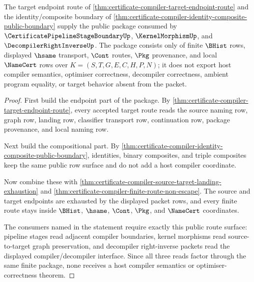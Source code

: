 \begin{theorem}
\label{thm:certificate-compiler-downstream-stage-unblock-package}
The target endpoint route of
\autoref{thm:certificate-compiler-target-endpoint-route} and the
identity/composite boundary of
\autoref{thm:certificate-compiler-identity-composite-public-boundary} supply
the public package consumed by $\CertificatePipelineStageBoundaryUp$,
$\KernelMorphismUp$, and $\DecompilerRightInverseUp$. The package consists
only of finite $\BHist$ rows, displayed $\hsame$ transport, $\Cont$ routes,
$\Pkg$ provenance, and local $\NameCert$ rows over
$K=(S,T,G,E,C,H,P,N)$; it does not export host compiler semantics, optimiser
correctness, decompiler correctness, ambient program equality, or target
behavior absent from the packet.
\end{theorem}
\begin{proof}
First build the endpoint part of the package. By
\autoref{thm:certificate-compiler-target-endpoint-route}, every accepted
target route reads the source naming row, graph row, landing row, classifier
transport row, continuation row, package provenance, and local naming row.

Next build the compositional part. By
\autoref{thm:certificate-compiler-identity-composite-public-boundary},
identities, binary composites, and triple composites keep the same public
row surface and do not add a host compiler coordinate.

Now combine these with
\autoref{thm:certificate-compiler-source-target-landing-exhaustion} and
\autoref{thm:certificate-compiler-finite-route-non-escape}. The source and
target endpoints are exhausted by the displayed packet rows, and every finite
route stays inside $\BHist$, $\hsame$, $\Cont$, $\Pkg$, and $\NameCert$
coordinates.

The consumers named in the statement require exactly this public route
surface: pipeline stages read adjacent compiler boundaries, kernel morphisms
read source-to-target graph preservation, and decompiler right-inverse
packets read the displayed compiler/decompiler interface. Since all three
reads factor through the same finite package, none receives a host compiler
semantics or optimiser-correctness theorem.
\end{proof}


